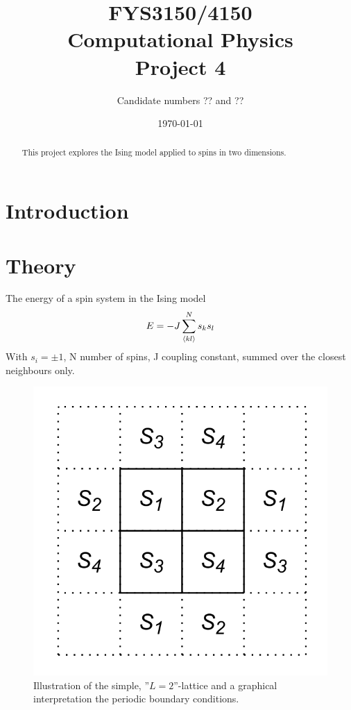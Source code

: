 \documentclass[11pt,a4paper,english]{article}
\title{FYS3150/4150\\Computational Physics\\Project 4}
\author{Candidate numbers ?? and ??}
\date{\today}
\numberwithin{equation}{section}
\begin{document}
\maketitle

\begin{abstract}
This project explores the Ising model applied to spins in two dimensions.
\end{abstract}



\section{Introduction}


\section{Theory}

The energy of a spin system in the Ising model 
\begin{gather}
E = -J\sum_{\expval{kl}}^N s_k s_l
\end{gather}
With $s_i = \pm 1$, N number of spins, J coupling constant, summed over 
the closest neighbours only.

\begin{figure}[H]
\centering
\includegraphics[scale=0.15]{pics/simple_lattice.png}
\caption{ Illustration of the simple, ''$L=2$''-lattice and a graphical interpretation the periodic boundary conditions.}
\label{eq:spin_neighbours}
\end{figure}
\end{document}
